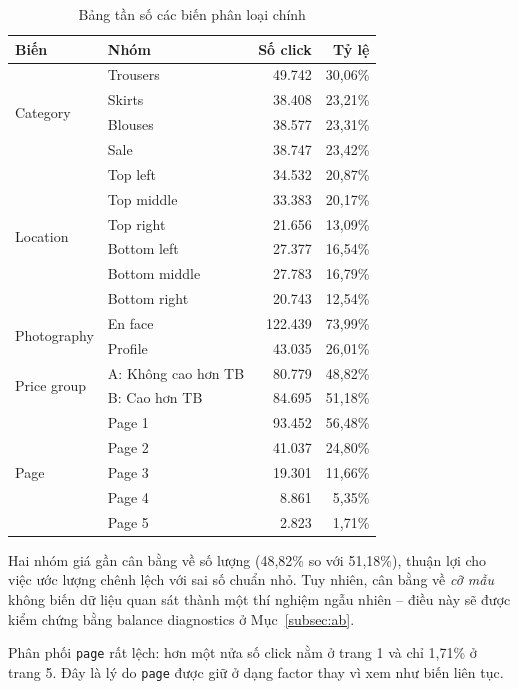 \begin{table}[H]
\centering
\caption{Bảng tần số các biến phân loại chính}
\label{tab:categorical}
\small
\begin{tabular}{llrr}
\toprule
\textbf{Biến} & \textbf{Nhóm} & \textbf{Số click} & \textbf{Tỷ lệ} \\
\midrule
\multirow{4}{*}{Category}
 & Trousers & 49.742 & 30,06\% \\
 & Skirts   & 38.408 & 23,21\% \\
 & Blouses  & 38.577 & 23,31\% \\
 & Sale     & 38.747 & 23,42\% \\
\midrule
\multirow{6}{*}{Location}
 & Top left      & 34.532 & 20,87\% \\
 & Top middle    & 33.383 & 20,17\% \\
 & Top right     & 21.656 & 13,09\% \\
 & Bottom left   & 27.377 & 16,54\% \\
 & Bottom middle & 27.783 & 16,79\% \\
 & Bottom right  & 20.743 & 12,54\% \\
\midrule
\multirow{2}{*}{Photography}
 & En face & 122.439 & 73,99\% \\
 & Profile & 43.035  & 26,01\% \\
\midrule
\multirow{2}{*}{Price group}
 & A: Không cao hơn TB & 80.779 & 48,82\% \\
 & B: Cao hơn TB       & 84.695 & 51,18\% \\
\midrule
\multirow{5}{*}{Page}
 & Page 1 & 93.452 & 56,48\% \\
 & Page 2 & 41.037 & 24,80\% \\
 & Page 3 & 19.301 & 11,66\% \\
 & Page 4 & 8.861  & 5,35\% \\
 & Page 5 & 2.823  & 1,71\% \\
\bottomrule
\end{tabular}
\end{table}

Hai nhóm giá gần cân bằng về số lượng (48,82\% so với 51,18\%), thuận lợi cho
việc ước lượng chênh lệch với sai số chuẩn nhỏ. Tuy nhiên, cân bằng về \emph{cỡ
mẫu} không biến dữ liệu quan sát thành một thí nghiệm ngẫu nhiên -- điều này sẽ
được kiểm chứng bằng balance diagnostics ở Mục~\ref{subsec:ab}.

Phân phối \texttt{page} rất lệch: hơn một nửa số click nằm ở trang 1 và chỉ
1,71\% ở trang 5. Đây là lý do \texttt{page} được giữ ở dạng factor thay vì xem
như biến liên tục.


